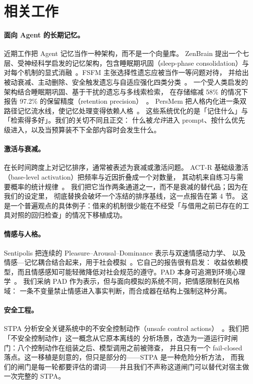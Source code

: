 \section{相关工作}

\paragraph{面向 Agent 的长期记忆。} 近期工作把 Agent 记忆当作一种架构，而不是一个向量库。
ZenBrain 提出一个七层、受神经科学启发的记忆架构，包含睡眠期巩固（sleep-phase
consolidation）与对每个机制的显式消融~\cite{zenbrain2026}。FSFM 主张选择性遗忘应被当作一等问题对待，
并给出被动衰减、主动删除、安全触发遗忘与自适应强化四类分类~\cite{fsfm2026}。
一个受人类启发的架构结合睡眠期巩固、基于干扰的遗忘与多线索检索，
在存储缩减 58\% 的情况下报告 97.2\% 的保留精度（retention precision）~\cite{himemory2026}。
PersMem 把人格内化进一条双路径记忆流水线，使记忆处理变得依赖人格~\cite{persmem2026}。
这些系统优化的是「记住什么」与「检索得多好」。我们的关切不同且正交：
什么被\emph{允许}进入 prompt、按什么优先级进入，以及当预算装不下全部内容时会发生什么。

\paragraph{激活与衰减。} 在长时间跨度上对记忆排序，通常被表述为衰减或激活问题。
ACT-R 基础级激活（base-level activation）把频率与近因折叠成一个对数量，
其动机来自练习与需要概率的统计规律~\cite{anderson1991,anderson2007}。
我们把它当作两条通道之一，而不是衰减的替代品；因为在我们的设定里，
彻底替换会破坏一个冻结的排序基线，这一点报告在第 4 节。
这是一个普遍观点的具体例子：借来的机制很少能在不经受「与借用之前已存在的工具对照的回归检查」的情况下移植成功。

\paragraph{情感与人格。} Sentipolis 把连续的 Pleasure--Arousal--Dominance 表示与双速情感动力学、
以及情感—记忆耦合结合起来，用于社会模拟~\cite{sentipolis2026}。它自己的报告很有启发：
收益依赖模型，而且情感感知可能轻微降低对社会规范的遵守。PAD 本身可追溯到环境心理学~\cite{mehrabian1974}。
我们采纳 PAD 作为表示，但与面向模拟的系统不同，把情感限制在风格域：
一条不变量禁止情感进入事实判断，而合成器在结构上强制这种分离。

\paragraph{安全工程。} STPA 分析安全关键系统中的不安全控制动作（unsafe control
actions）~\cite{leveson2011,leveson2018}。我们把「不安全控制动作」这一概念从它原本离线的
分析场景，改造为一道运行时闸门：八个控制动作在组装之后、模型调用之前被筛查，
并且只有一个 fail-closed 落点。这一移植是刻意的，但只是部分的——STPA 是一种危险分析方法，
而我们的闸门是每一轮都要评估的谓词——并且我们不声称这道闸门可以替代对宿主做一次完整的 STPA。

